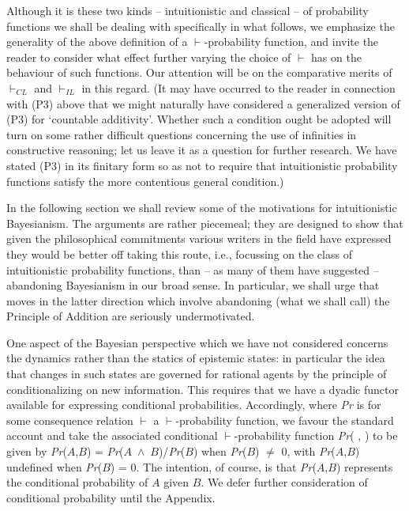 \documentclass[
  11pt,
  letterpaper,
  DIV=11,
  numbers=noendperiod,
  oneside]{scrartcl}
\begin{document}
Although it is these two kinds -- intuitionistic and classical -- of
probability functions we shall be dealing with specifically in what
follows, we emphasize the generality of the above definition of a
\(\vdash\)-probability function, and invite the reader to consider what
effect further varying the choice of \(\vdash\) has on the behaviour of
such functions. Our attention will be on the comparative merits of
\(\vdash_{CL}\) and \(\vdash_{IL}\) in this regard. (It may have
occurred to the reader in connection with (P3) above that we might
naturally have considered a generalized version of (P3) for `countable
additivity'. Whether such a condition ought be adopted will turn on some
rather difficult questions concerning the use of infinities in
constructive reasoning; let us leave it as a question for further
research. We have stated (P3) in its finitary form so as not to require
that intuitionistic probability functions satisfy the more contentious
general condition.)

In the following section we shall review some of the motivations for
intuitionistic Bayesianism. The arguments are rather piecemeal; they are
designed to show that given the philosophical commitments various
writers in the field have expressed they would be better off taking this
route, i.e., focussing on the class of intuitionistic probability
functions, than -- as many of them have suggested --abandoning
Bayesianism in our broad sense. In particular, we shall urge that moves
in the latter direction which involve abandoning (what we shall call)
the Principle of Addition are seriously undermotivated.

One aspect of the Bayesian perspective which we have not considered
concerns the dynamics rather than the statics of epistemic states: in
particular the idea that changes in such states are governed for
rational agents by the principle of conditionalizing on new information.
This requires that we have a dyadic functor available for expressing
conditional probabilities. Accordingly, where \emph{Pr} is for some
consequence relation \(\vdash\) a \(\vdash\)-probability function, we
favour the standard account and take the associated conditional
\(\vdash\)-probability function \emph{Pr}( , ) to be given by
\emph{Pr}(\(A\),\(B\)) =
\emph{Pr}(\(A\)~\({\wedge}\)~\(B\))/\emph{Pr}(\(B\)) when
\emph{Pr}(\(B\)) \({\neq}\) 0, with \emph{Pr}(\(A\),\(B\)) undefined
when \emph{Pr}(\(B\)) = 0. The intention, of course, is that
\emph{Pr}(\(A\),\(B\)) represents the conditional probability of \(A\)
given \(B\). We defer further consideration of conditional probability
until the Appendix.
\end{document}
